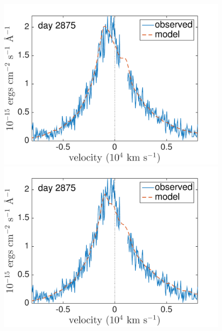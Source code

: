 \begin{figure}
\includegraphics[trim =0 35 20 0 ,clip=true,scale=0.39]{chapters/chapter5/images/clump_1/best_fit/d2875Ha.pdf}
\includegraphics[trim =30 35 0 0,clip=true,scale=0.39]{chapters/chapter5/images/clump_1/maximum/d2875Ha.pdf}


\end{figure}
